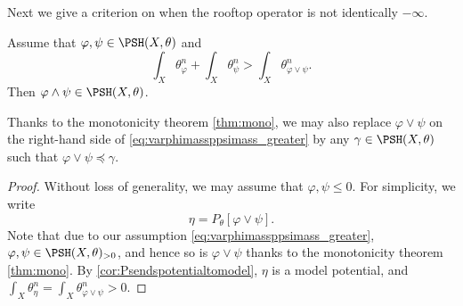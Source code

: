 Next we give a criterion on when the rooftop operator is not identically $-\infty$.
\begin{proposition}\label{prop:landfinitecond1}
    Assume that $\varphi,\psi\in \PSH(X,\theta)$ and
    \begin{equation}\label{eq:varphimassppsimass_greater}
        \int_X \theta_{\varphi}^n+\int_X \theta_{\psi}^n>\int_X \theta_{\varphi\lor\psi}^n.
    \end{equation}
    Then $\varphi\land \psi\in \PSH(X,\theta)$.
\end{proposition}
Thanks to the monotonicity theorem \cref{thm:mono}, we may also replace $\varphi\lor \psi$ on the right-hand side of \eqref{eq:varphimassppsimass_greater} by any $\gamma\in \PSH(X,\theta)$ such that $\varphi\lor \psi\preceq \gamma$.
\begin{proof}
    Without loss of generality, we may assume that $\varphi,\psi\leq 0$. For simplicity, we write
    \[
    \eta=P_{\theta}[\varphi\lor \psi].
    \]
    Note that due to our assumption \eqref{eq:varphimassppsimass_greater}, $\varphi,\psi\in \PSH(X,\theta)_{>0}$, and hence so is $\varphi\lor \psi$ thanks to the monotonicity theorem \cref{thm:mono}.
    By \cref{cor:Psendspotentialtomodel}, $\eta$ is a model potential, and $\int_X\theta_\eta^n=\int_X\theta_{\varphi\lor\psi}^n>0$.


\end{proof}
